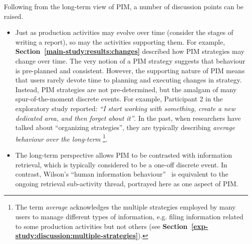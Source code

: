 Following from the long-term view of PIM, a number of discussion points can be raised.  
\begin{itemize}

\item Just as production activities may evolve over time (consider the stages of writing a report), so may the activities supporting them.  For example, \textbf{Section~\ref{main-study:results:changes}} described how PIM strategies may change over time.  The very notion of a PIM strategy suggests that behaviour is pre-planned and consistent.  However, the supporting nature of PIM means that users rarely devote time to planning and executing changes in strategy.  Instead, PIM strategies are not pre-determined, but the amalgam of many spur-of-the-moment discrete events.  For example, Participant 2 in the exploratory study reported: \textit{``I start working with something, create a new dedicated area, and then forget about it''}.  In the past, when researchers have talked about ``organizing strategies'', they are typically describing \textit{average behaviour over the long-term}
\footnote{The term \textit{average} acknowledges the multiple strategies employed by many users to manage different types of information, e.g. filing information related to some production activities but not others (see \textbf{Section~\ref{exp-study:discussion:multiple-strategies}}).}.




\item The long-term perspective allows PIM to be contrasted with information retrieval, which is typically considered to be a one-off discrete event.  In contrast, Wilson's ``human information behaviour''~\citep{wilson:00} is equivalent to the ongoing retrieval sub-activity thread, portrayed here as one aspect of PIM.  


\end{itemize}
